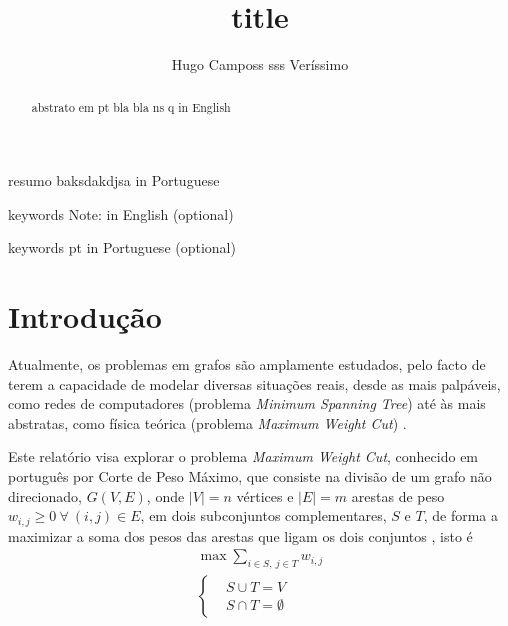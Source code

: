 \documentclass[mirror]{revdetua}
\begin{document}

\title{title}
\author{Hugo Camposs sss Veríssimo}
\maketitle

\begin{abstract}
abstrato em pt bla bla ns q in English
\end{abstract}

\begin{resumo}
resumo baksdakdjsa in Portuguese
\end{resumo}

\begin{keywords}
keywords Note: in English (optional)
\end{keywords}

\begin{palavraschave}
keywords pt in Portuguese (optional)
\end{palavraschave}

\section{Introdução}

Atualmente, os problemas em grafos são amplamente estudados, pelo facto de terem a capacidade de modelar diversas situações reais, desde as mais palpáveis, como redes de computadores (problema \textit{Minimum Spanning Tree}) até às mais abstratas, como física teórica (problema \textit{Maximum Weight Cut}) \cite{WP24}.

Este relatório visa explorar o problema \textit{Maximum Weight Cut}, conhecido em português por Corte de Peso Máximo, que consiste na divisão de um grafo não direcionado, $G(V, E)$, onde $|V| = n$ vértices e $|E| = m$ arestas de peso $w_{i,j} \geq 0\ \forall\ (i,j) \in E$, em dois subconjuntos complementares, $S$ e $T$, de forma a maximizar a soma dos pesos das arestas que ligam os dois conjuntos \cite{SC03}, isto é
\begin{equation*}
    \begin{split}
        \max \sum_{i \in S,\ j \in T} w_{i,j} \\ 
        \left\{\begin{split}
            &S \cup T = V \\
            &S \cap T = \emptyset
        \end{split}\right.
    \end{split}
\end{equation*}
\end{document}
